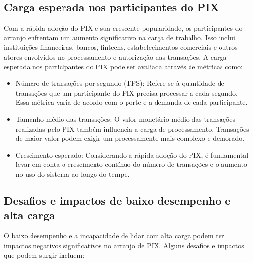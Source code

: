 \documentclass[12pt]{article}
\begin{document}
\subsection{Carga esperada nos participantes do PIX}  \label{sec:firstpage}

Com a rápida adoção do PIX e sua crescente popularidade, os participantes do arranjo enfrentam um aumento significativo na carga de trabalho. Isso inclui instituições financeiras, bancos, fintechs, estabelecimentos comerciais e outros atores envolvidos no processamento e autorização das transações. A carga esperada nos participantes do PIX pode ser avaliada através de métricas como:
\begin{itemize}
  \item Número de transações por segundo (TPS): Refere-se à quantidade de transações que um participante do PIX precisa processar a cada segundo. Essa métrica varia de acordo com o porte e a demanda de cada participante.

  \item Tamanho médio das transações: O valor monetário médio das transações realizadas pelo PIX também influencia a carga de processamento. Transações de maior valor podem exigir um processamento mais complexo e demorado.

  \item Crescimento esperado: Considerando a rápida adoção do PIX, é fundamental levar em conta o crescimento contínuo do número de transações e o aumento no uso do sistema ao longo do tempo.
\end{itemize}
\subsection{Desafios e impactos de baixo desempenho e alta carga}  \label{sec:firstpage}

O baixo desempenho e a incapacidade de lidar com alta carga podem ter impactos negativos significativos no arranjo de PIX. Alguns desafios e impactos que podem surgir incluem:
\end{document}
